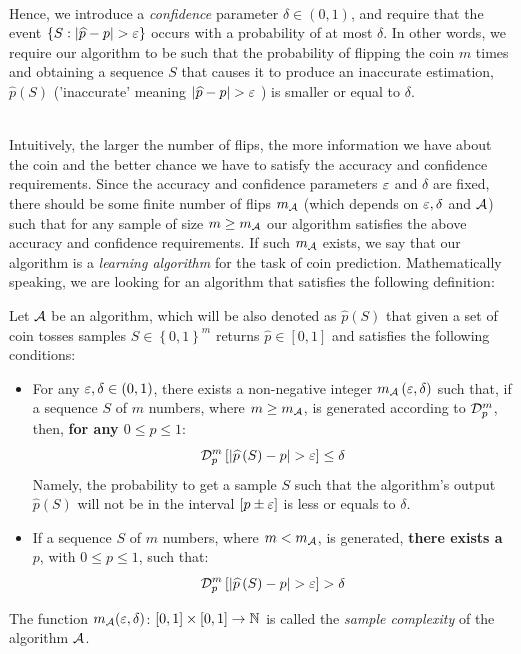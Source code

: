 ~\\Hence, we introduce a \emph{confidence} parameter $\delta\in\left(0,1\right)$, and require that the event $\left\{S : \left|\widehat{p}-p\right|>\eps\right\}$ occurs with a probability of at most $\delta$. In other words, we require our algorithm to be such that the probability of flipping the coin $m$ times and obtaining a sequence $S$ that causes it to produce an inaccurate estimation, $\widehat{p}\left(S\right)$ ('inaccurate' meaning $\left|\widehat{p}-p\right|>\eps$ ) is smaller or equal to $\delta$. 

~\\Intuitively, the larger the number of flips, the more information we have about the coin and the better chance we have to satisfy the accuracy and confidence requirements. 
Since the accuracy and confidence parameters $\varepsilon$ and $\delta$ are fixed, there should be some finite number of flips $m_{\mathcal{A}}$ (which depends on  $\varepsilon,\delta$ and $\mathcal{A}$) such that for any sample of size $m\ge m_{\mathcal{A}}$ our algorithm satisfies the above accuracy and confidence requirements. If such $m_{\mathcal{A}}$ exists, we say that our algorithm is a \textit{learning algorithm} for the task of coin prediction. Mathematically speaking, we are looking for an algorithm that satisfies the following definition:
    
\begin{definition}  \label{def:sampleCoin}
Let $\mathcal{A}$ be an algorithm, which will be also denoted as $\widehat{p}\left(S\right)$ that given a set of coin tosses samples $S\in\left\{0,1\right\}^m$ returns $\widehat{p}\in\left[0,1\right]$ and satisfies the following conditions:\\
\begin{itemize}
\item For any $\varepsilon,\delta\in\left(0,1\right)$, there exists a non-negative integer $m_{\mathcal{A}}\left(\varepsilon,\delta\right)$ such that, if a sequence $S$ of $m$ numbers, where $m\ge m_{\mathcal{A}}$, is generated according to $\mathcal{D} ^m_p$,  then,  \textbf{for any $0\le p\le 1$}: $$\mathcal{D} ^{m}_p \left[ \left|\widehat{p}\left(S\right)-p\right| > \varepsilon \right] \le  \delta$$
Namely, the probability to get a sample $S$ such that the algorithm's output $\widehat{p}\left(S\right)$ will not be in the interval $\left[p\pm\varepsilon\right]$ is less or equals to $\delta$.\\
\item If a sequence $S$ of $m$ numbers, where $m < m_{\mathcal{A}}$, is generated, \textbf{there exists a $p$}, with $0\le p\le 1$, such that:
		$$ \mathcal{D} ^{m}_p \left[ \left|\widehat{p}\left(S\right)-p\right| >  \varepsilon \right] > \delta$$
		
	\end{itemize}
The function $m_{\mathcal{A}}(\varepsilon,\delta)$: $\left[0,1\right]\times \left[0,1\right]\rightarrow \mathbb{N}$ is called the \emph{sample complexity} of the algorithm $\mathcal{A}$.
\end{definition}

